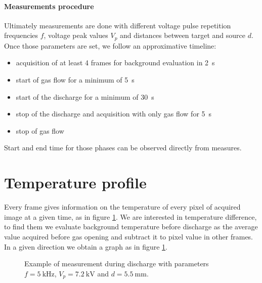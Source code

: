 \paragraph{Measurements procedure}
Ultimately measurements are done with different voltage pulse repetition frequencies $f$, voltage peak values $V_p$ and distances between target and source $d$.
Once those parameters are set, we follow an approximative timeline:
\begin{itemize}
 \item acquisition of at least \num{4} frames for background evaluation in \SI{2}{\second}
 \item start of gas flow for a minimum of \SI{5}{\second}
 \item start of the discharge for a minimum of \SI{30}{\second}
 \item stop of the discharge and acquisition with only gas flow for \SI{5}{\second}
 \item stop of gas flow
\end{itemize}

Start and end time for those phases can be observed directly from measures.

\section{Temperature profile}
Every frame gives information on the temperature of every pixel of acquired image at a given time, as in figure \ref{fig:exframe}. We are interested in temperature difference, to find them we evaluate background temperature before discharge as the average value acquired before gas opening and subtract it to pixel value in other frames. In a given direction we obtain a graph as in figure \ref{fig:exframe}.
\begin{figure}
 \centering
 \hfill
 \caption{Example of measurement during discharge with parameters $f = \SI{5}{\kilo\hertz}$, $V_p = \SI{7.2}{\kilo\volt}$ and $d = \SI{5.5}{\milli\meter}$.}
 \label{fig:exframe}
\end{figure}


